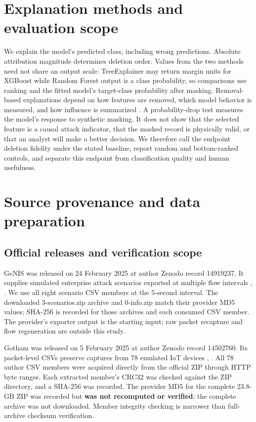 \documentclass[conference,letterpaper]{IEEEtran}
\begin{document}
\section{Explanation methods and evaluation scope}
We explain the model's predicted class, including wrong predictions. Absolute attribution magnitude determines deletion order. Values from the two methods need not share an output scale: TreeExplainer may return margin units for XGBoost while Random Forest output is a class probability, so comparisons use ranking and the fitted model's target-class probability after masking. Removal-based explanations depend on how features are removed, which model behavior is measured, and how influence is summarized \cite{ref33}. A probability-drop test measures the model's response to synthetic masking. It does not show that the selected feature is a causal attack indicator, that the masked record is physically valid, or that an analyst will make a better decision. We therefore call the endpoint deletion fidelity under the stated baseline, report random and bottom-ranked controls, and separate this endpoint from classification quality and human usefulness.

\section{Source provenance and data preparation}
\subsection{Official releases and verification scope}
GeNIS was released on 24 February 2025 at author Zenodo record 14919237. It supplies simulated enterprise attack scenarios exported at multiple flow intervals \cite{ref1}, \cite{ref2}. We use all eight scenario CSV members at the 5-second interval. The downloaded 3-scenarios.zip archive and 0-info.zip match their provider MD5 values; SHA-256 is recorded for those archives and each consumed CSV member. The provider's exporter output is the starting input; raw packet recapture and flow regeneration are outside this study.

Gotham was released on 5 February 2025 at author Zenodo record 14502760. Its packet-level CSVs preserve captures from 78 emulated IoT devices \cite{ref3}, \cite{ref4}. All 78 author CSV members were acquired directly from the official ZIP through HTTP byte ranges. Each extracted member's CRC32 was checked against the ZIP directory, and a SHA-256 was recorded. The provider MD5 for the complete 23.8-GB ZIP was recorded but \textbf{was not recomputed or verified}: the complete archive was not downloaded. Member integrity checking is narrower than full-archive checksum verification.
\end{document}

